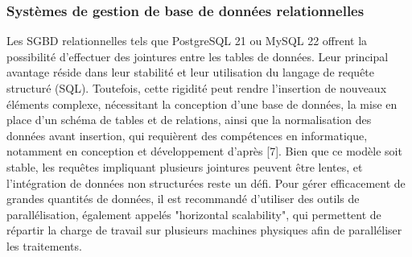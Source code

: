 \documentclass{article}
\begin{document}
	\subsubsection{Systèmes de gestion de base de données relationnelles}
	Les SGBD relationnelles tels que PostgreSQL 21 ou MySQL 22 offrent la possibilité d’effectuer des jointures entre les tables de données. Leur principal avantage réside dans leur stabilité et leur utilisation du langage de requête structuré (SQL). Toutefois, cette rigidité peut rendre l’insertion de nouveaux éléments complexe, nécessitant la conception d’une base de données, la mise en place d’un schéma de tables et de relations, ainsi que la normalisation des données avant insertion, qui requièrent des compétences en informatique, notamment en conception et développement d’après [7]. Bien que ce modèle soit stable, les requêtes impliquant plusieurs jointures peuvent être lentes, et l’intégration de données non structurées reste un défi. Pour gérer efficacement de grandes quantités de données, il est recommandé d’utiliser des outils de parallélisation, également appelés "horizontal scalability", qui permettent de répartir la charge de travail sur plusieurs machines physiques afin de paralléliser les traitements.
	
\end{document}
